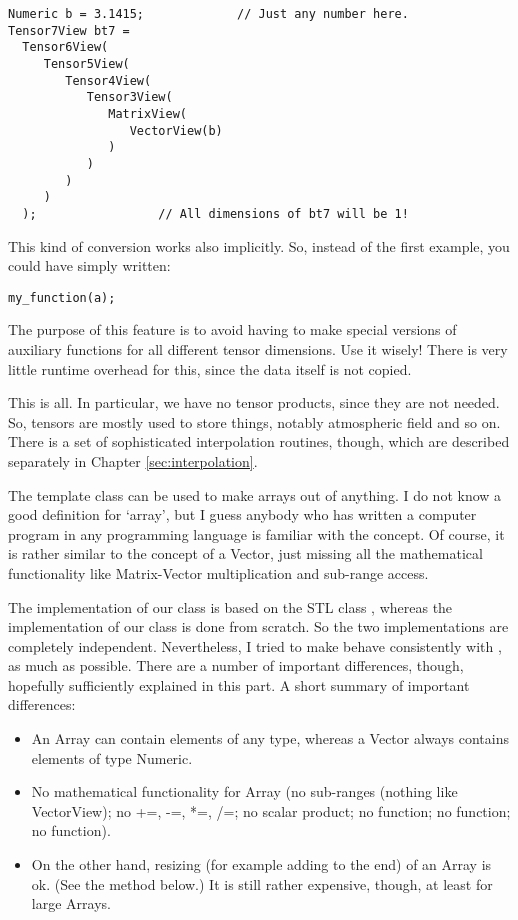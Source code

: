 \begin{verbatim}
Numeric b = 3.1415;             // Just any number here.
Tensor7View bt7 =
  Tensor6View(
     Tensor5View(
        Tensor4View(
           Tensor3View(
              MatrixView(
                 VectorView(b)
              )
           )
        )
     )
  );                 // All dimensions of bt7 will be 1!
\end{verbatim}

This kind of conversion works also implicitly. So, instead of the
first example, you could have simply written:
\begin{verbatim}
my_function(a);
\end{verbatim}

The purpose of this feature is to avoid having to make special
versions of auxiliary functions for all different tensor
dimensions. Use it wisely! There is very little runtime overhead for
this, since the data itself is not copied.


This is all. In particular, we have no tensor products, since they
are not needed. So, tensors are mostly used to store things, notably
atmospheric field and so on.  There is a set of sophisticated
interpolation routines, though, which are described separately in
Chapter \ref{sec:interpolation}.


\label{sec:matpack:arrays}

The template class  can be used to make arrays out of
anything. I do not know a good definition for `array', but I guess
anybody who has written a computer program in any programming language
is familiar with the concept. Of course, it is rather similar to the
concept of a Vector, just missing all the mathematical functionality
like Matrix-Vector multiplication and sub-range access.

The implementation of our  class is based on the STL class
, whereas the implementation of our 
class is done from scratch. So the two implementations are completely
independent. Nevertheless, I tried to make  behave
consistently with , as much as possible. There are a number
of important differences, though, hopefully sufficiently explained in
this part. A short summary of important differences:

\begin{itemize}
\item An Array can contain elements of any type, whereas a Vector
  always contains elements of type Numeric.
\item No mathematical functionality for Array (no sub-ranges (nothing
  like VectorView); no +=, -=, *=, /=; no scalar product; no
   function; no  function; no
   function).
\item On the other hand, resizing (for example adding to the end) of
  an Array is ok. (See the  method below.) It is still
  rather expensive, though, at least for large Arrays. 
\end{itemize}

